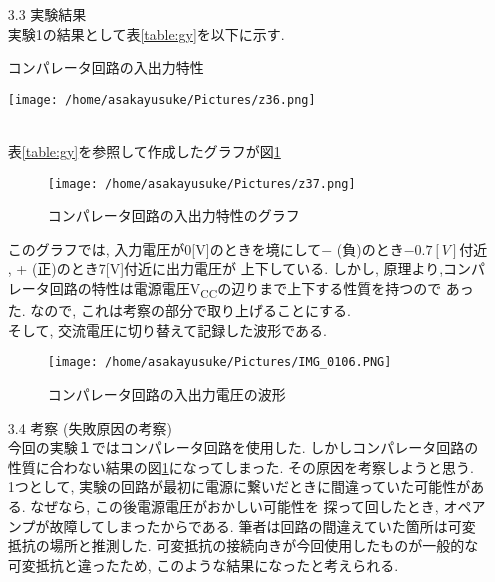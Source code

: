 \documentclass[uplatex,a4paper,11pt,dvipdfmxs]{jsarticle}
\begin{document}
\begin{enumerate}
\begin{enumerate}
        \item[3.3] 実験結果\\
        実験1の結果として表\ref{table:gy}を以下に示す.
        \begin{table}[H]
            \centering
            \caption{コンパレータ回路の入出力特性}
            \label{table:gy}
            \texttt{[image: /home/asakayusuke/Pictures/z36.png]}
        \end{table}
        \\
        表\ref{table:gy}を参照して作成したグラフが図\ref{figure:to}\\
        \begin{figure}[H]
            \centering
            \texttt{[image: /home/asakayusuke/Pictures/z37.png]}
            \caption{コンパレータ回路の入出力特性のグラフ}
            \label{figure:to}
        \end{figure}
        このグラフでは, 入力電圧が0[V]のときを境にして\(-\) (負)のとき\(-0.7[V]付近\), + (正)のとき7[V]付近に出力電圧が
        上下している. しかし, 原理より,コンパレータ回路の特性は電源電圧V\textsubscript{CC}の辺りまで上下する性質を持つので
        あった. なので, これは考察の部分で取り上げることにする. \\

        そして, 交流電圧に切り替えて記録した波形である. 
        \begin{figure}[H]
            \centering
            \texttt{[image: /home/asakayusuke/Pictures/IMG\_0106.PNG]}
            \caption{コンパレータ回路の入出力電圧の波形}
        \end{figure}

        \item[3.4] 考察 (失敗原因の考察)\\
        今回の実験１ではコンパレータ回路を使用した. しかしコンパレータ回路の性質に合わない結果の図\ref{figure:to}になってしまった. 
        その原因を考察しようと思う. \\

        1つとして, 実験の回路が最初に電源に繋いだときに間違っていた可能性がある. なぜなら, この後電源電圧がおかしい可能性を
        探って回したとき, オペアンプが故障してしまったからである. 筆者は回路の間違えていた箇所は可変抵抗の場所と推測した. 
        可変抵抗の接続向きが今回使用したものが一般的な可変抵抗と違ったため, このような結果になったと考えられる. \\
        

\end{enumerate}
\end{enumerate}
\end{document}
